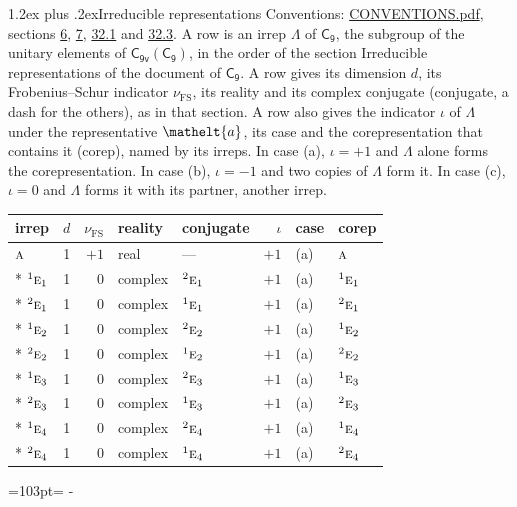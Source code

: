 \documentclass[10pt,a4paper]{article}
\makeatletter
\renewcommand\section{\@startsection{section}{1}{\z@}{-3ex plus -1ex minus -.2ex}%
  {1.2ex plus .2ex}{\normalfont\large\sffamily\bfseries\color{parttitle}}}
\newcommand{\needspace}[1]{\par\penalty-100\begingroup\dimen0=#1\relax\dimen2=\pagegoal
  \advance\dimen2-\pagetotal\ifdim\dimen0>\dimen2\relax\ifdim\dimen2>0pt\vfil\break\fi\fi
  \endgroup}
\numberwithin{equation}{section}
\newcommand{\eltfont}[1]{{\let\sigma\eltsigma\mathelt{#1}}}
\newcommand{\grp}[1]{\mathsf{#1}}
\newcommand{\irr}[1]{\text{\normalfont\scshape #1}}
\newcommand{\conjpair}[1]{{}^{#1}}
\newcommand{\elt}[1]{\eltfont{#1}}
\newcommand{\fsind}{\nu_{\mathrm{FS}}}
\makeatother
\begin{document}
\section{Irreducible representations}\label{s:irreps}
Conventions: \href{../../CONVENTIONS.pdf}{CONVENTIONS.pdf}, sections \href{../../../rotation/CONVENTIONS.pdf\#conv.6}{6}, \href{../../../rotation/CONVENTIONS.pdf\#conv.7}{7}, \href{../../CONVENTIONS.pdf\#conv.32.1}{32.1} and \href{../../CONVENTIONS.pdf\#conv.32.3}{32.3}.
\leavevmode\label{n:irrep.Delta}A row is an irrep $\Lambda$ of $\grp{C_{9}}$, the subgroup of the unitary elements of $\grp{C_{9v}}(\grp{C_{9}})$, in the order of the section Irreducible representations of the document of \href{../../../rotation/data/pdf/C9.pdf}{$\grp{C_{9}}$}. \label{n:index.dimension}\label{n:index.frobenius}\label{n:head.irrep}\label{n:head.reality}\label{n:head.conjugate}A row gives its dimension $d$, its Frobenius--Schur indicator $\fsind$, its reality and its complex conjugate (conjugate, a dash for the others), as in that section. \label{n:head.case.corep}\label{n:head.corep}A row also gives the indicator $\iota$ of $\Lambda$ under the representative $\elt{a}$, its case and the corepresentation that contains it (corep), named by its irreps. In case (a), $\iota = +1$ and $\Lambda$ alone forms the corepresentation. In case (b), $\iota = -1$ and two copies of $\Lambda$ form it. In case (c), $\iota = 0$ and $\Lambda$ forms it with its partner, another irrep.
\setlength{\emergencystretch}{2em}\par\setlength{\emergencystretch}{0pt}
{\small\renewcommand{\arraystretch}{1.25}\setlength{\tabcolsep}{4pt}\begin{longtable}{@{}lrrllrll@{}}\toprule
irrep & $d$ & $\fsind$ & reality & conjugate & $\iota$ & case & corep\\\midrule\endhead
\bottomrule\endfoot\endlastfoot
$\irr{a}$ & 1 & $+1$ & real & --- & $+1$ & (a) & $\irr{a}$\\*
$\conjpair{1}\irr{e}_{1}$ & 1 & $0$ & complex & $\conjpair{2}\irr{e}_{1}$ & $+1$ & (a) & $\conjpair{1}\irr{e}_{1}$\\*
$\conjpair{2}\irr{e}_{1}$ & 1 & $0$ & complex & $\conjpair{1}\irr{e}_{1}$ & $+1$ & (a) & $\conjpair{2}\irr{e}_{1}$\\*
$\conjpair{1}\irr{e}_{2}$ & 1 & $0$ & complex & $\conjpair{2}\irr{e}_{2}$ & $+1$ & (a) & $\conjpair{1}\irr{e}_{2}$\\*
$\conjpair{2}\irr{e}_{2}$ & 1 & $0$ & complex & $\conjpair{1}\irr{e}_{2}$ & $+1$ & (a) & $\conjpair{2}\irr{e}_{2}$\\*
$\conjpair{1}\irr{e}_{3}$ & 1 & $0$ & complex & $\conjpair{2}\irr{e}_{3}$ & $+1$ & (a) & $\conjpair{1}\irr{e}_{3}$\\*
$\conjpair{2}\irr{e}_{3}$ & 1 & $0$ & complex & $\conjpair{1}\irr{e}_{3}$ & $+1$ & (a) & $\conjpair{2}\irr{e}_{3}$\\*
$\conjpair{1}\irr{e}_{4}$ & 1 & $0$ & complex & $\conjpair{2}\irr{e}_{4}$ & $+1$ & (a) & $\conjpair{1}\irr{e}_{4}$\\*
$\conjpair{2}\irr{e}_{4}$ & 1 & $0$ & complex & $\conjpair{1}\irr{e}_{4}$ & $+1$ & (a) & $\conjpair{2}\irr{e}_{4}$\\
\bottomrule\end{longtable}}
\needspace{103pt}
\end{document}
